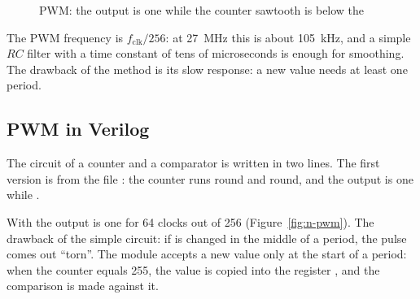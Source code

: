 \begin{figure}[H]
\centering
{}
\caption{PWM: the output is one while the counter sawtooth is below the }
\label{fig:pwm_wave}
\end{figure}

The PWM frequency is $f_{\text{clk}}/256$: at 27~MHz this is about 105~kHz, and
a simple $RC$ filter with a time constant of tens of microseconds is enough for
smoothing. The drawback of the method is its slow response: a new value
needs at least one period.

\subsection{PWM in Verilog}

The circuit of a counter and a comparator is written in two lines. The first
version is from the file : the counter  runs round and
round, and the output is one while .



With  the output is one for 64 clocks out of 256
(Figure~\ref{fig:n-pwm}). The drawback of the simple circuit: if  is
changed in the middle of a period, the pulse comes out ``torn''. The module
 accepts a new value only at the start of a period: when the counter
equals 255, the value is copied into the register , and the comparison
is made against it.

